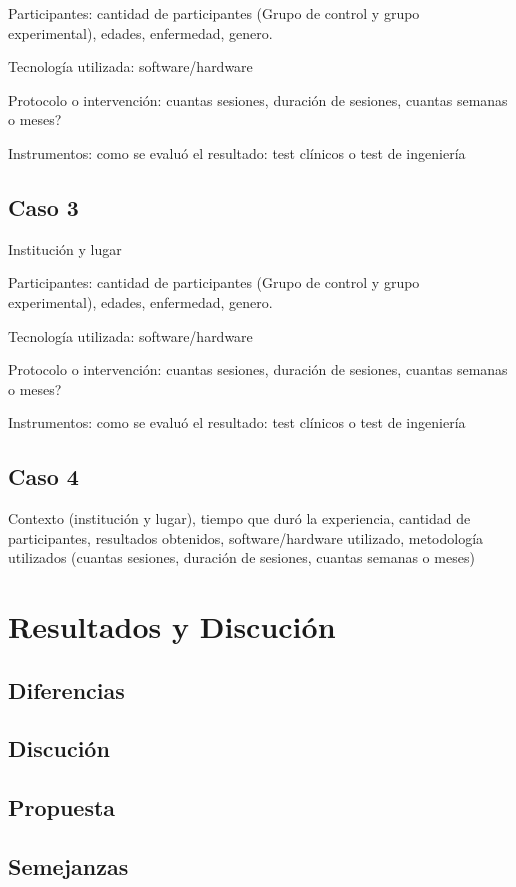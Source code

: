 \documentclass[journal]{IEEEtran}
\begin{document}
Participantes: cantidad de participantes (Grupo de control y grupo experimental), edades, enfermedad, genero.

Tecnología utilizada: software/hardware 

Protocolo o intervención: cuantas sesiones, duración de sesiones, cuantas semanas o meses?

Instrumentos: como se evaluó el resultado: test clínicos o test de ingeniería 


\subsection{Caso 3}
Institución y lugar

Participantes: cantidad de participantes (Grupo de control y grupo experimental), edades, enfermedad, genero.

Tecnología utilizada: software/hardware 

Protocolo o intervención: cuantas sesiones, duración de sesiones, cuantas semanas o meses?

Instrumentos: como se evaluó el resultado: test clínicos o test de ingeniería 


\subsection{Caso 4}
Contexto (institución y lugar), tiempo que duró la experiencia, cantidad de participantes, resultados obtenidos, software/hardware utilizado, metodología utilizados (cuantas sesiones, duración de sesiones, cuantas semanas o meses) 

\section{Resultados y Discución}
\subsection{Diferencias}
\subsection{Discución}
\subsection{Propuesta}
\subsection{Semejanzas}






\balance






\end{document}
